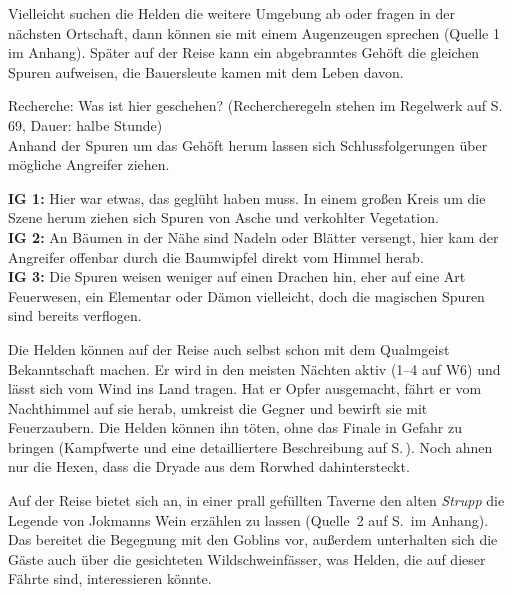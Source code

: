 Vielleicht suchen die Helden die weitere Umgebung ab oder fragen in der nächsten Ortschaft, dann können sie mit einem Augenzeugen sprechen (Quelle 1 im Anhang). Später auf der Reise kann ein abgebranntes Gehöft die gleichen Spuren aufweisen, die Bauersleute kamen mit dem Leben davon.


{Recherche: Was ist hier geschehen? (Rechercheregeln stehen im Regelwerk auf S. 69, Dauer: halbe Stunde)\\
Anhand der Spuren um das Gehöft herum lassen sich Schlussfolgerungen über mögliche Angreifer ziehen.

\textbf{IG 1:} Hier war etwas, das geglüht haben muss. In einem großen Kreis um die Szene herum ziehen sich Spuren von Asche und verkohlter Vegetation.\\
\textbf{IG 2:} An Bäumen in der Nähe sind Nadeln oder Blätter versengt, hier kam der Angreifer offenbar durch die Baumwipfel direkt vom Himmel herab.\\
\textbf{IG 3:} Die Spuren weisen weniger auf einen Drachen hin, eher auf eine Art Feuerwesen, ein Elementar oder Dämon vielleicht, doch die magischen Spuren sind bereits verflogen.
}

Die Helden können auf der Reise auch selbst schon mit dem Qualmgeist Bekanntschaft machen.
Er wird in den meisten Nächten aktiv (1--4 auf W6) und lässt sich vom Wind ins Land tragen.
Hat er Opfer ausgemacht, fährt er vom Nachthimmel auf sie herab, umkreist die Gegner und bewirft sie mit Feuerzaubern.
Die Helden können ihn töten, ohne das Finale in Gefahr zu bringen (Kampfwerte und eine detailliertere Beschreibung auf S.\,\pageref{geist}).
Noch ahnen nur die Hexen, dass die Dryade aus dem Rorwhed dahintersteckt.

Auf der Reise bietet sich an, in einer prall gefüllten Taverne den alten \emph{Strupp} die Legende von Jokmanns Wein erzählen zu lassen (Quelle~2 auf S.\,\pageref{aiw_quelle2} im Anhang).
Das bereitet die Begegnung mit den Goblins vor, außerdem unterhalten sich die Gäste auch über die gesichteten Wildschweinfässer, was Helden, die auf dieser Fährte sind, interessieren könnte.

